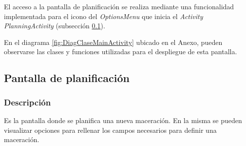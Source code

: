                 \par El acceso a la pantalla de planificación se realiza mediante una funcionalidad implementada para el icono del \textit{OptionsMenu} que inicia el \textit{Activity PlanningActivity} (subsección \ref{DescripPantallaPlanificación}).
                
                \par En el diagrama \ref{fig:DiagClaseMainActivity} ubicado en el Anexo, pueden observarse las clases y funciones utilizadas para el despliegue de esta pantalla.
                
                
                
        \subsection{Pantalla de planificación}
        \label{DescripPantallaPlanificación}
        \subsubsection{Descripción}
                \par Es la pantalla donde se planifica una nueva maceración. En la misma se pueden visualizar opciones para rellenar los campos necesarios para definir una maceración.
                
